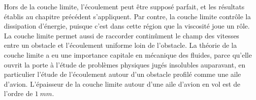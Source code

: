 \documentclass[12pt,fancy]{cours}
\begin{document}
\begin{remarque}
	Hors de la couche limite, l'écoulement peut être supposé parfait, et les résultats établis au chapitre précédent s'appliquent. Par contre, la couche limite contrôle la dissipation d'énergie, puisque c'est dans cette région que la viscosité joue un rôle. La couche limite permet aussi de raccorder continûment le champ des vitesses entre un obstacle et l'écoulement uniforme loin de l'obstacle. La théorie de la couche limite a eu une importance capitale en mécanique des fluides, parce qu'elle ouvrit la porte à l'étude de problèmes physiques jugés insolubles auparavant, en particulier l'étude de l'écoulement autour d'un obstacle profilé comme une aile d'avion. L'épaisseur de la couche limite autour d'une aile d'avion en vol est de l'ordre de $\SI{1}{mm}$.
\end{remarque}
\end{document}
